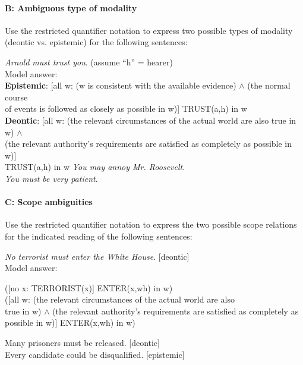 \paragraph*{B: Ambiguous type of modality}
Use the restricted quantifier notation to express two possible types of modality (deontic vs. epistemic) for the following sentences:

\ea 
 \ea  \textit{Arnold must trust you}.  (assume “h” = hearer)\\
\textsf{Model answer:\\
}\textsf{\textbf{Epistemic}}\textsf{: [all w: (w is consistent with the available evidence) $\wedge$ (the normal course \\
  of events is followed as closely as possible in w)] TRUST(a,h) in w\\
}\textsf{\textbf{Deontic}}\textsf{: [all w: (the relevant circumstances of the actual world are also true in w) $\wedge$\\
  (the relevant authority’s requirements are satisfied as completely as possible in w)]\\
  TRUST(a,h) in w}
\ex \textit{You may annoy Mr. Roosevelt}.\\
\ex \textit{You must be very patient}.
\z \z

\paragraph*{C: Scope ambiguities}

Use the restricted quantifier notation to express the two possible scope relations for the indicated reading of the following sentences:

\ea 
\ea  \textit{No terrorist must enter the White House}.  [deontic]\\
Model answer:\\
\begin{xlisti} \ex{}   ([no x: TERRORIST(x)] ENTER(x,wh) in w)\\
\ex\relax [no x: TERRORIST(x)] ([all w: (the relevant circumstances of the actual world are also \\
  true in w) $\wedge$ (the relevant authority’s requirements are satisfied as completely as \\
  possible in w)] ENTER(x,wh) in w)
\end{xlisti}
\ex Many prisoners must be released.  [deontic]\\
\ex Every candidate could be disqualified.  [epistemic]
\z
\z
{}

